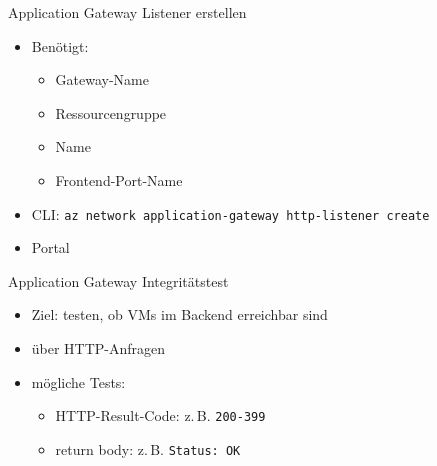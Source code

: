 \begin{flashcard}[Definition]{Application Gateway Listener erstellen}
    \begin{itemize}
        \item Benötigt:
            \begin{itemize}
                \item Gateway-Name
                \item Ressourcengruppe
                \item Name
                \item Frontend-Port-Name
            \end{itemize}
        \item CLI: \texttt{az network application-gateway http-listener create}
        \item Portal
    \end{itemize}
\end{flashcard}

\begin{flashcard}[Definition]{Application Gateway Integritätstest}
    \begin{itemize}
        \item Ziel: testen, ob VMs im Backend erreichbar sind
        \item über HTTP-Anfragen
        \item mögliche Tests:
            \begin{itemize}
                \item HTTP-Result-Code:\newline
                    z.\,B. \texttt{200-399}
                \item return body:\newline
                    z.\,B. \texttt{Status: OK}
            \end{itemize}
    \end{itemize}
\end{flashcard}

